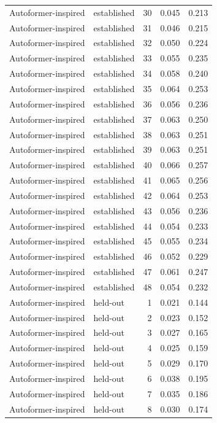\begin{tabular}{llrrr}
Autoformer-inspired & established & 30 & 0.045 & 0.213 \\
Autoformer-inspired & established & 31 & 0.046 & 0.215 \\
Autoformer-inspired & established & 32 & 0.050 & 0.224 \\
Autoformer-inspired & established & 33 & 0.055 & 0.235 \\
Autoformer-inspired & established & 34 & 0.058 & 0.240 \\
Autoformer-inspired & established & 35 & 0.064 & 0.253 \\
Autoformer-inspired & established & 36 & 0.056 & 0.236 \\
Autoformer-inspired & established & 37 & 0.063 & 0.250 \\
Autoformer-inspired & established & 38 & 0.063 & 0.251 \\
Autoformer-inspired & established & 39 & 0.063 & 0.251 \\
Autoformer-inspired & established & 40 & 0.066 & 0.257 \\
Autoformer-inspired & established & 41 & 0.065 & 0.256 \\
Autoformer-inspired & established & 42 & 0.064 & 0.253 \\
Autoformer-inspired & established & 43 & 0.056 & 0.236 \\
Autoformer-inspired & established & 44 & 0.054 & 0.233 \\
Autoformer-inspired & established & 45 & 0.055 & 0.234 \\
Autoformer-inspired & established & 46 & 0.052 & 0.229 \\
Autoformer-inspired & established & 47 & 0.061 & 0.247 \\
Autoformer-inspired & established & 48 & 0.054 & 0.232 \\
Autoformer-inspired & held-out & 1 & 0.021 & 0.144 \\
Autoformer-inspired & held-out & 2 & 0.023 & 0.152 \\
Autoformer-inspired & held-out & 3 & 0.027 & 0.165 \\
Autoformer-inspired & held-out & 4 & 0.025 & 0.159 \\
Autoformer-inspired & held-out & 5 & 0.029 & 0.170 \\
Autoformer-inspired & held-out & 6 & 0.038 & 0.195 \\
Autoformer-inspired & held-out & 7 & 0.035 & 0.186 \\
Autoformer-inspired & held-out & 8 & 0.030 & 0.174 \\

\end{tabular}
